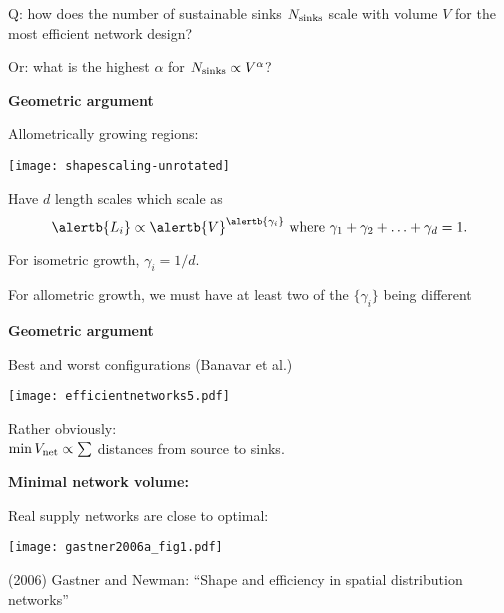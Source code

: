      \alert{Q:} how does the number of sustainable
      sinks $N_{\textnormal{sinks}}$
      scale with volume $V$ for the most efficient network design?
     
      \alert{Or:} what is the highest $\alpha$ for $N_{\textnormal{sinks}} \propto V^{\alpha}$?
    
  


  \textbf{Geometric argument}

  
   Allometrically growing regions:
  \begin{center}
    \texttt{[image: shapescaling-unrotated]}    
  \end{center}
  \bigskip
   Have $d$ length scales which scale
    as 
    {
      $$
      \alertb{L_i} \propto \alertb{V}^{\alertb{\gamma_i}}
      \mbox{\ where $\gamma_1 + \gamma_2 + \ldots + \gamma_d = 1$.}
      $$
    }
   
    For \alert{isometric} growth, $\gamma_i = 1/d$.
  
    For \alert{allometric} growth, 
    we must have at least two of the $\{\gamma_i\}$ being different
  



  \textbf{Geometric argument}

  
   Best and worst configurations (Banavar et al.)
    \begin{center}
      \texttt{[image: efficientnetworks5.pdf]}
    \end{center}
    \bigskip
   \alert{Rather obviously:}\\
    $\min V_{\textnormal{net}} \propto \sum$
    distances
    from source to sinks.

  


  \textbf{Minimal network volume:}

  Real supply networks are close to optimal:

  \texttt{[image: gastner2006a\_fig1.pdf]}

  \bigskip

  {\small (2006)
    Gastner and Newman\cite{gastner2006a}:
    ``Shape and efficiency in spatial distribution networks'' }


